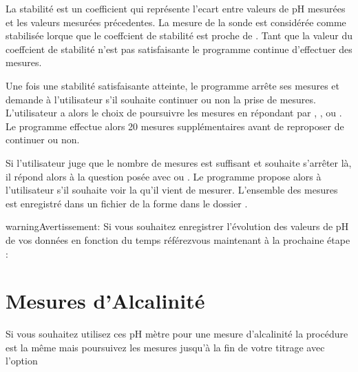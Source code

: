 \documentclass[letterpaper,10pt,french]{sphinxmanual}
\begin{document}
\sphinxAtStartPar
La stabilité est un coefficient qui représente l’ecart entre  valeurs de pH mesurées et les  valeurs mesurées précedentes.
La mesure de la sonde est considérée comme stabilisée lorque que le coeffcient de stabilité est proche de .
Tant que la valeur du coeffcient de stabilité n’est pas satisfaisante le programme continue d’effectuer des mesures.

\sphinxAtStartPar
Une fois une stabilité satisfaisante atteinte, le programme arrête ses mesures et demande à l’utilisateur s’il souhaite continuer ou non la prise de mesures.
L’utilisateur a alors le choix de poursuivre les mesures en répondant par , ,  ou . Le programme effectue alors 20 mesures
supplémentaires avant de reproposer de continuer ou non.

\sphinxAtStartPar
Si l’utilisateur juge que le nombre de mesures est suffisant et souhaite s’arrêter là, il répond alors à la question posée avec  ou .
Le programme propose alors à l’utilisateur s’il souhaite voir la {\hyperref[\detokenize{graph:graph}]{}} qu’il vient de mesurer.
L’ensemble des mesures est enregistré dans un fichier  de la forme  dans le dossier .

\begin{sphinxadmonition}{warning}{Avertissement:}
\sphinxAtStartPar
Si vous souhaitez enregistrer l’évolution des valeurs de pH de vos données en fonction du temps référez\sphinxhyphen{}vous maintenant à la prochaine étape :

\sphinxAtStartPar
{\hyperref[\detokenize{graph:graph}]{}}
\end{sphinxadmonition}


\section{Mesures d’Alcalinité}
\label{\detokenize{mesure:mesures-d-alcalinite}}
\sphinxAtStartPar
Si vous souhaitez utilisez ces pH mètre pour une mesure d’alcalinité la procédure est la même mais poursuivez les mesures jusqu’à la fin de votre titrage avec l’option
\end{document}
